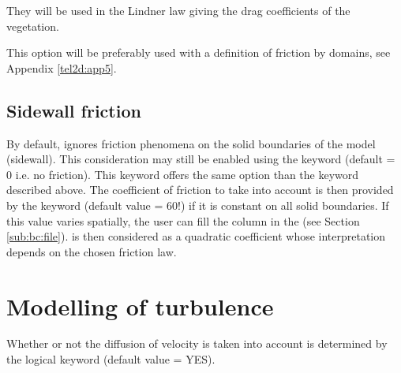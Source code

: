 They will be used in the Lindner law giving the drag coefficients of the
vegetation.

This option will be preferably used with a definition of friction by domains,
see Appendix \ref{tel2d:app5}.


\subsection{Sidewall friction}

By default,  ignores friction phenomena on the solid boundaries
of the model (sidewall).
This consideration may still be enabled using the keyword
 (default = 0 i.e. no friction).
This keyword offers the same option than the keyword
 described above.
The coefficient of friction to take into account is then provided
by the keyword 
(default value = 60!) if it is constant on all solid boundaries.
If this value varies spatially, the user can fill the column 
in the  (see Section \ref{sub:bc:file}).
 is then considered as a quadratic coefficient whose
interpretation depends on the chosen friction law.


\section{Modelling of turbulence}
\label{sec:mod:turbul}
Whether or not the diffusion of velocity is taken into account is determined
by the logical keyword  (default value = YES).

